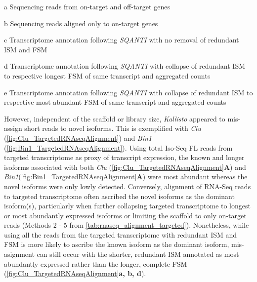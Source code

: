 \begin{table}[h]
\begin{threeparttable}
\begin{tabular}{@{}cll@{}}
		\end{tabular}
		\begin{tablenotes}
			\footnotesize
			\item[a] Sequencing reads from on-target and off-target genes
			\item[b] Sequencing reads aligned only to on-target genes
			\item[c] Transcriptome annotation following \textit{SQANTI} with no removal of redundant ISM and FSM
			\item[d] Transcriptome annotation following \textit{SQANTI} with collapse of redundant ISM to respective longest FSM of same transcript and aggregated counts
			\item[e] Transcriptome annotation following \textit{SQANTI} with collapse of redundant ISM to respective most abundant FSM of same transcript and aggregated counts 
		\end{tablenotes}
	\end{threeparttable}
\end{table}

However, independent of the scaffold or library size, \textit{Kallisto} appeared to mis-assign short reads to novel isoforms. This is exemplified with \textit{Clu} (\cref{fig:Clu_TargetedRNAseqAlignment}) and \textit{Bin1} (\cref{fig:Bin1_TargetedRNAseqAlignment}).   Using total Iso-Seq FL reads from targeted transcriptome as proxy of transcript expression, the known and longer isoforms associated with both \textit{Clu} (\cref{fig:Clu_TargetedRNAseqAlignment}\textbf{A}) and \textit{Bin1}(\cref{fig:Bin1_TargetedRNAseqAlignment}\textbf{A}) were most abundant whereas the novel isoforms were only lowly detected. Conversely, alignment of RNA-Seq reads to targeted transcriptome often ascribed the novel isoforms as the dominant isoform(s), particularly when further collapsing targeted transcriptome to longest or most abundantly expressed isoforms or limiting the scaffold to only on-target reads (Methods 2 - 5 from \cref{tab:rnaseq_alignment_targeted}). Nonetheless, while using all the reads from the targeted transcriptome with redundant ISM and FSM is more likely to ascribe the known isoform as the dominant isoform, mis-asignment can still occur with the shorter, redundant ISM annotated as most abundantly expressed rather than the longer, complete FSM (\cref{fig:Clu_TargetedRNAseqAlignment}\textbf{a, b, d}).

